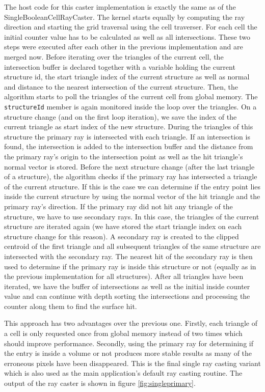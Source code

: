 The host code for this caster implementation is exactly the same as of the SingleBooleanCellRayCaster. The kernel starts equally by computing the ray direction and starting the grid traversal using the cell traverser. For each cell the initial counter value has to be calculated as well as all intersections. These two steps were executed after each other in the previous implementation and are merged now. Before iterating over the triangles of the current cell, the intersection buffer is declared together with a variable holding the current structure id, the start triangle index of the current structure as well as normal and distance to the nearest intersection of the current structure. Then, the algorithm starts to poll the triangles of the current cell from global memory. The \lstinline!structureId! member is again monitored inside the loop over the triangles. On a structure change (and on the first loop iteration), we save the index of the current triangle as start index of the new structure. During the triangles of this structure the primary ray is intersected with each triangle. If an intersection is found, the intersection is added to the intersection buffer and the distance from the primary ray's origin to the intersection point as well as the hit triangle's normal vector is stored. Before the next structure change (after the last triangle of a structure), the algorithm checks if the primary ray has intersected a triangle of the current structure. If this is the case we can determine if the entry point lies inside the current structure by using the normal vector of the hit triangle and the primary ray's direction. If the primary ray did not hit any triangle of the structure, we have to use secondary rays. In this case, the triangles of the current structure are iterated again (we have stored the start triangle index on each structure change for this reason). A secondary ray is created to the clipped centroid of the first triangle and all subsequent triangles of the same structure are intersected with the secondary ray. The nearest hit of the secondary ray is then used to determine if the primary ray is inside this structure or not (equally as in the previous implementation for all structures). After all triangles have been iterated, we have the buffer of intersections as well as the initial inside counter value and can continue with depth sorting the intersections and processing the counter along them to find the surface hit.

This approach has two advantages over the previous one. Firstly, each triangle of a cell is only requested once from global memory instead of two times which should improve performance. Secondly, using the primary ray for determining if the entry is inside a volume or not produces more stable results as many of the erroneous pixels have been disappeared. This is the final single ray casting variant which is also used as the main application's default ray casting routine. The output of the ray caster is shown in figure \ref{fig:singleprimary}.

